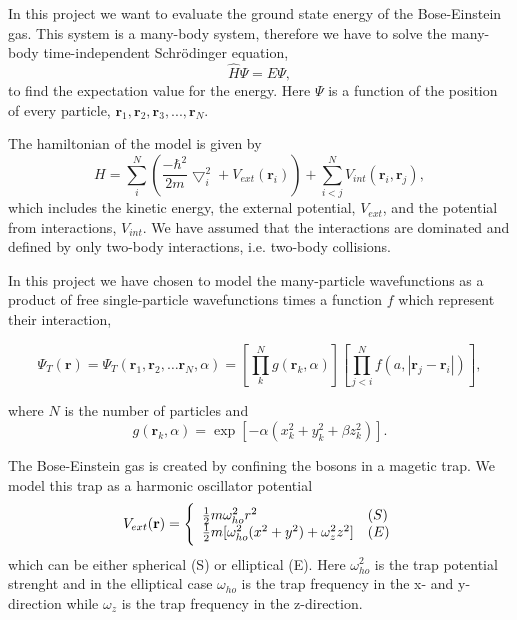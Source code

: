 In this project we want to evaluate the ground state energy of the Bose-Einstein gas. This system is a many-body system, therefore we have to solve the many-body time-independent Schrödinger equation,
\begin{equation}\label{eq:SE}
\hat{H} \Psi = E\Psi,
\end{equation}
to find the expectation value for the energy. Here $\Psi$ is a function of the position of every particle, $\mathbf{r}_1, \mathbf{r}_2, \mathbf{r}_3, ... , \mathbf{r}_N$. 

The hamiltonian of the model is given by
 \begin{equation}
     H = \sum_i^N \left(\frac{-\hbar^2}{2m}{\bigtriangledown }_{i}^2 +V_{ext}({\mathbf{r}}_i)\right)  +
	 \sum_{i<j}^{N} V_{int}({\mathbf{r}}_i,{\mathbf{r}}_j),
 \end{equation}
which includes the kinetic energy, the external potential, $V_{ext}$, and the potential from interactions, $V_{int}$. We have assumed that the interactions are dominated and defined by only two-body interactions, i.e. two-body collisions.

In this project we have chosen to model the many-particle wavefunctions as a product of free single-particle wavefunctions times a function $f$ which represent their interaction,

 \begin{equation}
 \Psi_T(\mathbf{r})=\Psi_T(\mathbf{r}_1, \mathbf{r}_2, \dots \mathbf{r}_N,\alpha)
 =\left[
    \prod^N_k g(\mathbf{r}_k, \alpha)
 \right]
 \left[
    \prod_{j<i}^Nf(a,|\mathbf{r}_j-\mathbf{r}_i|)
 \right],
 \label{eq:trialwf}
 \end{equation}

where $N$ is the number of particles and 
 \begin{equation}\label{eq:phi}
    g(\mathbf{r}_k, \alpha)= \exp{[-\alpha(x_k^2+y_k^2+\beta z_k^2)]}.
 \end{equation}

The Bose-Einstein gas is created by confining the bosons in a magetic trap. We model this trap as a harmonic oscillator potential 
\begin{equation}
 V_{ext}(\mathbf{r}) = 
 \Bigg\{
 \begin{array}{ll}
	 \frac{1}{2}m\omega_{ho}^2r^2 & (S)\\
 \strut
	 \frac{1}{2}m[\omega_{ho}^2(x^2+y^2) + \omega_z^2z^2] & (E)
 \label{eq:trap_eqn}
 \end{array}
 \end{equation}
which can be either spherical (S) or elliptical (E). Here $\omega^2_{ho}$ is the trap potential strenght and in the elliptical case $\omega_{ho}$ is the trap frequency in the x- and y- direction while $\omega_z$ is the trap frequency in the z-direction.
 
